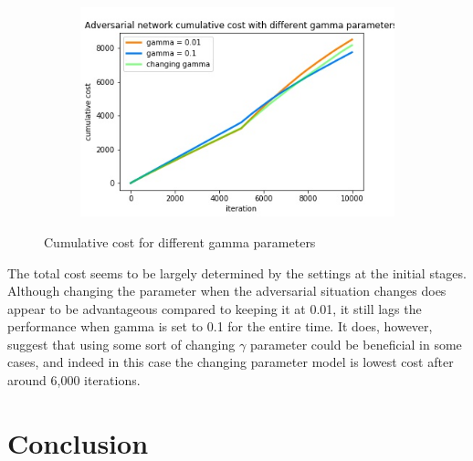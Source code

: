 \begin{figure}[h!]
\centering
\begin{subfigure}{1.0\textwidth}
  \centering
  \includegraphics[width=10cm]{../plots/changing_gamma_cumul_cost.jpg}
  \caption{}
  \label{}
\end{subfigure}
\caption{Cumulative cost for different gamma parameters}
\label{fig:ullm-particle}
\end{figure}

The total cost seems to be largely determined by the settings at the initial stages. Although changing the parameter when the adversarial situation changes does appear to be advantageous compared to keeping it at 0.01, it still lags the performance when gamma is set to 0.1 for the entire time. It does, however, suggest that using some sort of changing $\gamma$ parameter could be beneficial in some cases, and indeed in this case the changing parameter model is lowest cost after around 6,000 iterations.

\pagebreak

\section{Conclusion}


\appendix %



%
%






